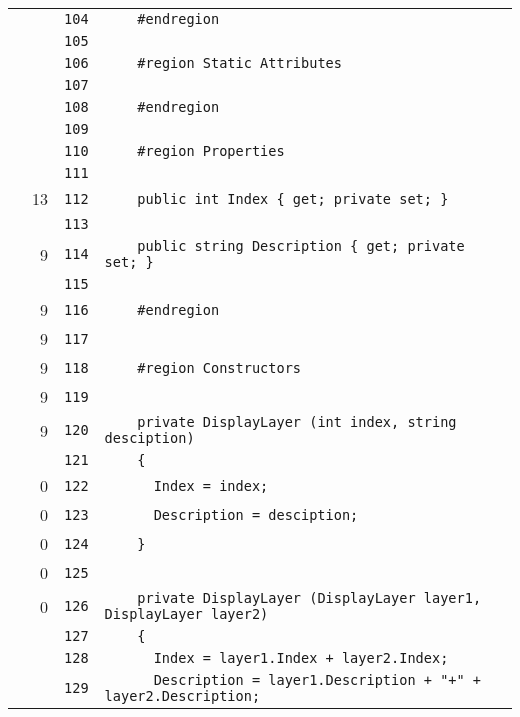 \documentclass[a4paper,10pt]{article}
\begin{document}
\begin{longtable}[l]{lrrl}
\cellcolor{gray} &  & \verb~104~ & \verb~    #endregion~\\
\cellcolor{gray} &  & \verb~105~ & \verb~~\\
\cellcolor{gray} &  & \verb~106~ & \verb~    #region Static Attributes~\\
\cellcolor{gray} &  & \verb~107~ & \verb~~\\
\cellcolor{gray} &  & \verb~108~ & \verb~    #endregion~\\
\cellcolor{gray} &  & \verb~109~ & \verb~~\\
\cellcolor{gray} &  & \verb~110~ & \verb~    #region Properties~\\
\cellcolor{gray} &  & \verb~111~ & \verb~~\\
\cellcolor{green} & 13 & \verb~112~ & \verb~    public int Index { get; private set; }~\\
\cellcolor{gray} &  & \verb~113~ & \verb~~\\
\cellcolor{green} & 9 & \verb~114~ & \verb~    public string Description { get; private set; }~\\
\cellcolor{gray} &  & \verb~115~ & \verb~~\\
\cellcolor{green} & 9 & \verb~116~ & \verb~    #endregion~\\
\cellcolor{green} & 9 & \verb~117~ & \verb~~\\
\cellcolor{green} & 9 & \verb~118~ & \verb~    #region Constructors~\\
\cellcolor{green} & 9 & \verb~119~ & \verb~~\\
\cellcolor{green} & 9 & \verb~120~ & \verb~    private DisplayLayer (int index, string desciption)~\\
\cellcolor{gray} &  & \verb~121~ & \verb~    {~\\
\cellcolor{red} & 0 & \verb~122~ & \verb~      Index = index;~\\
\cellcolor{red} & 0 & \verb~123~ & \verb~      Description = desciption;~\\
\cellcolor{red} & 0 & \verb~124~ & \verb~    }~\\
\cellcolor{red} & 0 & \verb~125~ & \verb~~\\
\cellcolor{red} & 0 & \verb~126~ & \verb~    private DisplayLayer (DisplayLayer layer1, DisplayLayer layer2)~\\
\cellcolor{gray} &  & \verb~127~ & \verb~    {~\\
\cellcolor{gray} &  & \verb~128~ & \verb~      Index = layer1.Index + layer2.Index;~\\
\cellcolor{gray} &  & \verb~129~ & \verb~      Description = layer1.Description + "+" + layer2.Description;~\\

\end{longtable}
\end{document}
